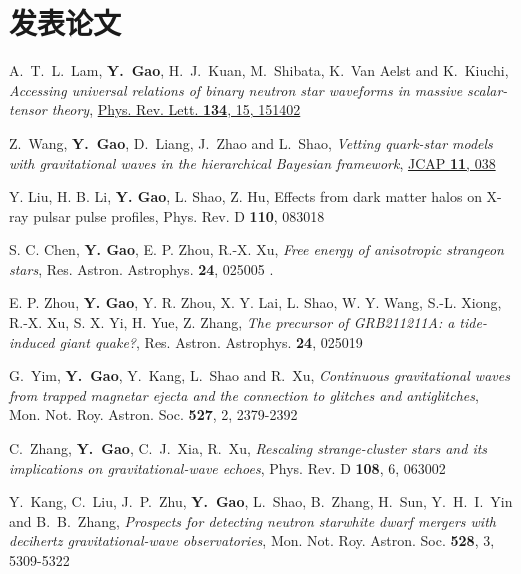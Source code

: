 \section{发表论文}
\begin{etaremune}
  \item 
  A.~T.~L.~Lam, {\bf Y.~Gao}, H.~J.~Kuan, M.~Shibata, K.~Van Aelst and K.~Kiuchi,
  {\it Accessing universal relations of binary neutron star waveforms in massive scalar-tensor theory},
  \href{https://journals.aps.org/prl/abstract/10.1103/PhysRevLett.134.151402}{Phys. Rev. Lett. {\bf 134}, 15, 151402}
  \item 
  Z.~Wang, {\bf Y.~Gao}, D.~Liang, J.~Zhao and L.~Shao,
  {\it Vetting quark-star models with gravitational waves in the hierarchical Bayesian framework},
  \href{https://iopscience.iop.org/article/10.1088/1475-7516/2024/11/038}{JCAP {\bf 11}, 038}
  \item 
  Y. Liu, H. B. Li, {\bf Y. Gao}, L. Shao, Z. Hu, Effects from dark matter halos on X-ray pulsar pulse profiles, Phys. Rev. D {\bf 110}, 083018 
  \item 
  S. C. Chen, {\bf Y. Gao}, E. P. Zhou, R.-X. Xu, {\it Free energy of anisotropic strangeon stars}, Res. Astron. Astrophys. {\bf 24}, 025005 .
  \item 
  E. P. Zhou, 
  {\bf Y. Gao}, 
  Y. R. Zhou, 
  X. Y. Lai, L. Shao, W. Y. Wang, S.-L. Xiong, R.-X. Xu, S. X. Yi, H. Yue, Z. Zhang, 
  {\it The precursor of GRB211211A: a tide-induced giant quake?}, Res. Astron. Astrophys. {\bf 24}, 025019
  \item 
  G.~Yim, {\bf Y.~Gao}, Y.~Kang, L.~Shao and R.~Xu,
  {\it Continuous gravitational waves from trapped magnetar ejecta and the connection to glitches and antiglitches},
  Mon. Not. Roy. Astron. Soc. {\bf 527}, 2, 2379-2392 
  \item 
  C.~Zhang, 
  {\bf Y.~Gao}, 
  C.~J.~Xia,
  R.~Xu,
  {\it Rescaling strange-cluster stars and its implications on gravitational-wave echoes},
  Phys. Rev. D {\bf 108}, 6, 063002
  \item 
  Y.~Kang, C.~Liu, J.~P.~Zhu, {\bf Y.~Gao}, L.~Shao, B.~Zhang, H.~Sun, Y.~H.~I.~Yin and B.~B.~Zhang,
  {\it Prospects for detecting neutron star\textendash{}white dwarf mergers with decihertz gravitational-wave observatories},
  Mon. Not. Roy. Astron. Soc. {\bf 528}, 3, 5309-5322
  \item 

\end{etaremune}
